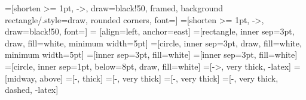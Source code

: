 \renewcommand{\.}{. \;}
\theoremstyle{definition}
\newtheorem*{definition}{Definition}
\newtheorem*{example}{Example}

\theoremstyle{plain}
\newtheorem{theorem}{Theorem}

\theoremstyle{remark}
\newtheorem*{remark}{Remark}

\newcommand{\pto}{\nrightarrow}
\newcommand{\ptree}[3]{
	\ifx&#2&%
	(#1 \rightrightarrows #3)
	\else
	(#1^#2 \rightrightarrows #3)
	\fi
}

\newcommand{\allgraphs}[1]{\mathcal{G}_{#1}}
\newcommand{\alltgraphs}[1]{\mathcal{TG}_{#1}}
\newcommand{\emptyGraph}{\varepsilon}
\newcommand{\startG}[1]{Z_{#1}}
\newcommand{\startTG}[1]{Z_{#1}}
\newcommand{\pro}{\to}

\newcommand{\rel}{\sim}
\newcommand{\rrestr}{\triangleright}

\newcommand{\source}{\operatorname{s}}
\newcommand{\Source}{\operatorname{S}}
\newcommand{\target}{\operatorname{t}}
\newcommand{\Target}{\operatorname{T}}


\newcommand{\neigh}[1]{\operatorname{neigh}_{#1}}
\newcommand{\scont}[2]{\eta_{#1}(#2)}
\newcommand{\cont}[2]{\operatorname{cont}_{#1}(#2)}
\newcommand{\emb}[1]{\operatorname{emb}(#1)}

\newcommand{\st}{\; | \;}
\newcommand{\isomorph}{\cong}
\newcommand{\ms}[1]{\overset{#1}{\leftarrow}}
\newcommand{\mt}[1]{\overset{#1}{\rightarrow}}
\newcommand{\cderiv}[3]{
	\ifx&#2&%
	\overset{#1}{\Rrightarrow}_{#3}
	\else
	\overset{#1,#2}{\Rrightarrow}_{#3}
	\fi
}
\newcommand{\deriv}[3]{
	\ifx&#2&%
	\overset{#1}{\Rightarrow}_{#3}
	\else
	\overset{#1,#2}{\Rightarrow}_{#3}
	\fi
}
\newcommand{\derivtr}[3]{
	\ifx&#2&%
	\overset{#1}{\Rightarrow^*}_{#3}
	\else
	\overset{#1,#2}{\Rightarrow^*}_{#3}
	\fi
}
\newcommand{\tcderiv}[3]{
	\ifx&#2&%
	\overset{#1}{\Rrightarrow}_{#3}
	\else
	\overset{#1,#2}{\Rrightarrow}_{#3}
	\fi
}
\newcommand{\tderiv}[3]{
	\ifx&#2&%
	\overset{#1}{\Rightarrow}_{#3}
	\else
	\overset{#1,#2}{\Rightarrow}_{#3}
	\fi
}
\newcommand{\tderivtr}[3]{
	\ifx&#2&%
	\overset{#1}{\Rightarrow^*}_{#3}
	\else
	\overset{#1,#2}{\Rightarrow^*}_{#3}
	\fi
}

\newcommand{\?}{\;\operatorname{\textbf{?}}\;}
\renewcommand{\:}{\;\operatorname{\textbf{:}}\;}
\newcommand{\Break}{\textbf{break}}
\newcommand{\Select}{\textbf{select}}

=[shorten >= 1pt, ->, draw=black!50, framed, background rectangle/.style={draw, rounded corners}, font=\scriptsize ]
=[shorten >= 1pt, ->, draw=black!50, font=\scriptsize]
 = [align=left, anchor=east]
=[rectangle, inner sep=3pt, draw, fill=white, minimum width=5pt]
=[circle, inner sep=3pt, draw, fill=white, minimum width=5pt]
=[inner sep=3pt, fill=white]
=[inner sep=3pt, fill=white]
=[circle, inner sep=1pt, below=8pt, draw, fill=white]
=[->, very thick, -latex]
=[midway, above]
=[-, thick]
=[-, very thick]
=[-, very thick]
=[-, very thick, dashed, -latex]
